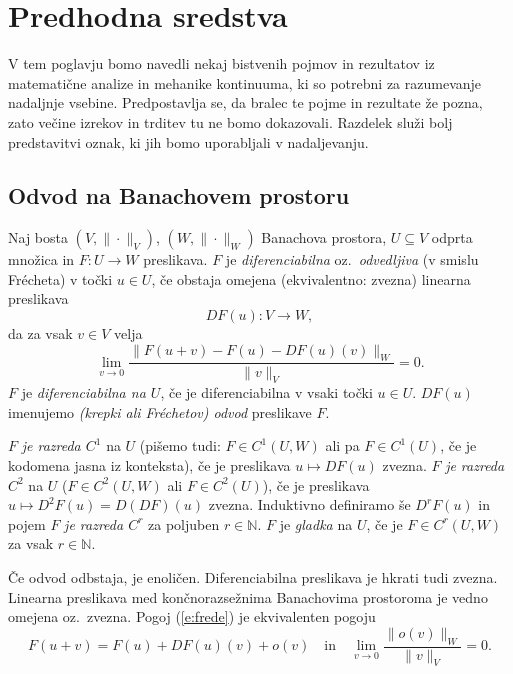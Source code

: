 \chapter{Predhodna sredstva}


V tem poglavju bomo navedli nekaj bistvenih pojmov in rezultatov iz matematične analize
in mehanike kontinuuma, ki so potrebni za razumevanje nadaljnje vsebine. Predpostavlja
se, da bralec te pojme in rezultate že pozna, zato večine izrekov in trditev
tu ne bomo dokazovali. Razdelek služi bolj predstavitvi oznak, ki jih
bomo uporabljali v nadaljevanju.


\section{Odvod na Banachovem prostoru}


\begin{definicija} \label{def:odvod}
	Naj bosta $(V,\|\cdot\|_V)$, $(W,\|\cdot\|_W)$ Banachova prostora, $U\subseteq V$ odprta
	množica in $F\colon U\to W$ preslikava. $F$ je \emph{diferenciabilna} oz.~\emph{odvedljiva}
	(v smislu Frécheta) v točki $u\in U$, če obstaja omejena (ekvivalentno: zvezna) linearna preslikava
	\[ DF(u)\colon V\to W, \]
	da za vsak $v\in V$ velja
	\begin{equation} \label{e:frede}
		\lim_{v\to 0}\frac{\|F(u+v)-F(u)-DF(u)(v)\|_W}{\|v\|_V}=0.
	\end{equation}
	$F$ je \emph{diferenciabilna na $U$}, če je diferenciabilna v vsaki točki $u\in U$.
	$DF(u)$ imenujemo \emph{(krepki ali Fréchetov) odvod} preslikave $F$.
	
	$F$ \emph{je razreda $C^1$} na $U$ (pišemo tudi: $F\in C^1(U,W)$ ali pa $F\in C^1(U)$,
	če je kodomena jasna iz konteksta), če je preslikava $u\mapsto DF(u)$ zvezna.
	$F$ \emph{je razreda $C^2$} na $U$ ($F\in C^2(U,W)$ ali $F\in C^2(U)$),
	če je preslikava $u\mapsto D^2F(u)=D(DF)(u)$ zvezna. Induktivno definiramo še $D^rF(u)$ in pojem
	$F$ \emph{je razreda $C^r$} za poljuben $r\in\mathbb{N}$. $F$ je \emph{gladka} na $U$,
	če je $F\in C^r(U,W)$ za vsak $r\in\mathbb{N}$.
\end{definicija}

Če odvod odbstaja, je enoličen. Diferenciabilna preslikava je hkrati tudi zvezna.
Linearna preslikava med končnorazsežnima Banachovima prostoroma je vedno omejena
oz.~zvezna. Pogoj (\ref{e:frede}) je ekvivalenten pogoju
\begin{equation*} %
	F(u+v)=F(u)+DF(u)(v)+o(v)\quad\textrm{in}\quad
	\lim_{v\to 0}\frac{\|o(v)\|_W}{\|v\|_V}=0.
\end{equation*}

